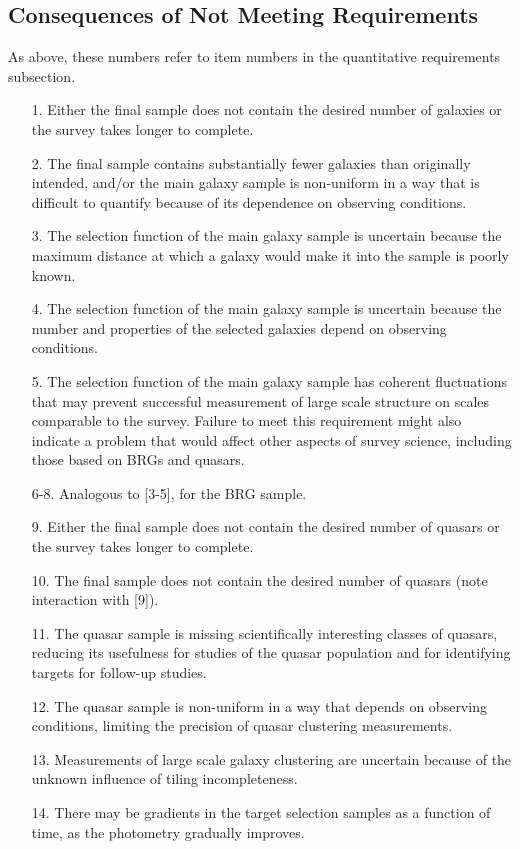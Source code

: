 \subsection{Consequences of Not Meeting Requirements}
As above, these numbers refer to item numbers in the quantitative
requirements subsection. 

\begin{enumerate}
\item[1.] Either the final sample does not contain the desired number
of galaxies or the survey takes longer to complete.  
\item[2.] The final sample contains substantially fewer galaxies than
originally intended, and/or the main galaxy sample is non-uniform in a
way that is difficult to quantify because of its dependence on observing
conditions.
\item[3.] The selection function of the main galaxy sample is uncertain 
because the maximum distance at which a galaxy would make it into the
sample is poorly known.
\item[4.] The selection function of the main galaxy sample is uncertain
because the number and properties of the selected galaxies depend on
observing conditions.
\item[5.] The selection function of the main galaxy sample has coherent
fluctuations that may prevent successful measurement of large scale
structure on scales comparable to the survey.  Failure to meet this
requirement might also indicate a problem that would affect other
aspects of survey science, including those based on BRGs and quasars.
\item[6-8.] Analogous to [3-5], for the BRG sample.
\item[9.] Either the final sample does not contain the desired number of 
quasars or the survey takes longer to complete.
\item[10.] The final sample does not contain the desired number of quasars
(note interaction with [9]).
\item[11.] The quasar sample is missing scientifically interesting classes
of quasars, reducing its usefulness for studies of the quasar population
and for identifying targets for follow-up studies.
\item[12.] The quasar sample is non-uniform in a way that depends on 
observing conditions, limiting the precision of quasar clustering measurements.
\item[13.] Measurements of large scale galaxy clustering are uncertain
because of the unknown influence of tiling incompleteness.
\item[14.] There may be gradients in the target selection samples as a
function of time, as the photometry gradually improves. 
\end{enumerate}

